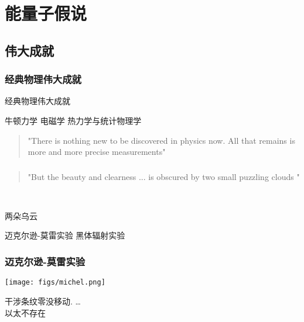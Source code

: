 \section{能量子假说}

\subsection{伟大成就}

\begin{frame}[t]
    \frametitle{经典物理伟大成就}
    \begin{atcbox}
    {经典物理伟大成就}
        \begin{enumerate}
            \Item 牛顿力学
            \Item 电磁学
            \Item 热力学与统计物理学
        \end{enumerate}
    \end{atcbox}  
    \begin{quotation}
        "There is nothing new to be discovered in physics now. All that remains is 
        more and more precise measurements"   \\
    \end{quotation}
\end{frame}

\begin{frame}
    \frametitle{}
    \begin{quotation}
        "But the beauty and clearness ... is obscured by two small puzzling clouds \faCloud "  \\
    \end{quotation}
    ~~ \vspace{0.3em}
    \begin{atcbox}{两朵乌云}    
        \begin{enumerate}
        \Item 迈克尔逊-莫雷实验
        \Item 黑体辐射实验
        \end{enumerate}
    \end{atcbox} 
\end{frame}

\begin{frame}
    \frametitle{迈克尔逊-莫雷实验}
    \begin{center}
    \texttt{[image: figs/michel.png]}
    \end{center}
    干涉条纹零没移动. \dots \\
    以太不存在
\end{frame}

